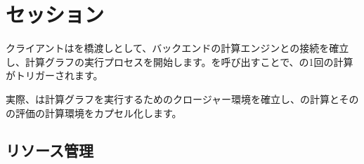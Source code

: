 \begin{savequote}[45mm]
\end{savequote}

\chapter{セッション} 
\label{ch:session}

\begin{content}

クライアントはを橋渡しとして、バックエンドの計算エンジンとの接続を確立し、計算グラフの実行プロセスを開始します。を呼び出すことで、の1回の計算がトリガーされます。

実際、は計算グラフを実行するためのクロージャー環境を確立し、の計算とそのの評価の計算環境をカプセル化します。

\end{content}

\section{リソース管理}

